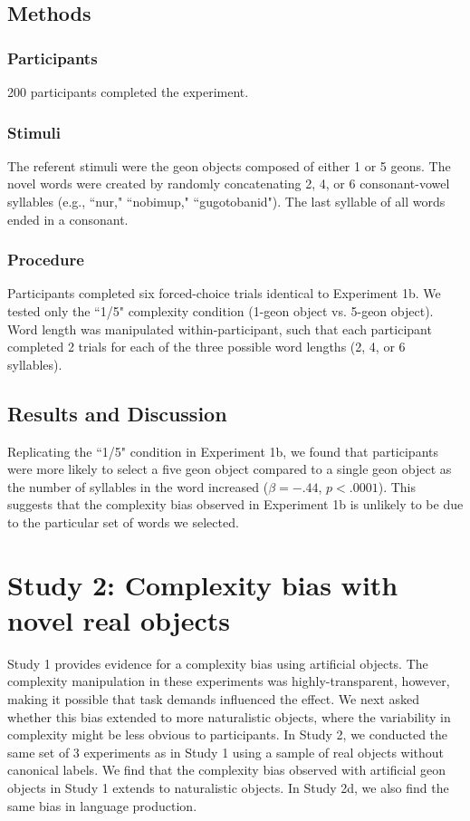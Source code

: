 \documentclass[man]{apa2}
\begin{document}
\subsection{Methods}
\subsubsection{Participants} 200 participants completed the experiment.
\subsubsection{Stimuli} The referent stimuli were the geon objects composed of either 1 or 5 geons. The novel words were created by randomly concatenating 2, 4, or 6 consonant-vowel syllables (e.g., ``nur," ``nobimup," ``gugotobanid"). The last syllable of all words ended in a consonant. 

\subsubsection{Procedure}
Participants completed six forced-choice trials identical to Experiment 1b. We tested only the ``1/5" complexity condition (1-geon object vs. 5-geon object). Word length was manipulated within-participant, such that each participant completed 2 trials for each of the three possible word lengths (2, 4, or 6 syllables).

\subsection{Results and Discussion}
Replicating the ``1/5" condition in Experiment 1b, we found that participants were more likely to select a five geon object compared to a single geon object as the number of syllables in the word increased ($\beta=-.44$, $p <.0001$). This suggests that the complexity bias observed in Experiment 1b is unlikely to be due to the particular set of words we selected.

\section{Study 2: Complexity bias with novel real objects} 

Study 1 provides evidence for a complexity bias using artificial objects. The complexity manipulation in these experiments was highly-transparent, however, making it possible that task demands influenced the effect. We next asked whether this bias extended to more naturalistic objects, where the variability in complexity might be less obvious to participants. In Study 2, we conducted the same set of 3 experiments as in Study 1 using a sample of real objects without canonical labels. We find that the complexity bias observed with artificial geon objects in Study 1 extends to naturalistic objects. In Study 2d, we also find the same bias in language production.
\end{document}
